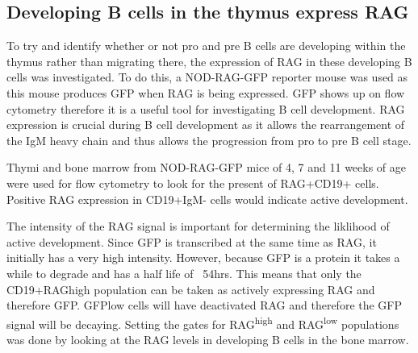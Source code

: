 \subsection{Developing B cells in the thymus express RAG}


To try and identify whether or not pro and pre B cells are developing within the thymus rather than migrating there, the expression of RAG in these developing B cells was investigated.
To do this, a NOD-RAG-GFP reporter mouse was used as this mouse produces GFP when RAG is being expressed.
GFP shows up on flow cytometry therefore it is a useful tool for investigating B cell development.
RAG expression is crucial during B cell development as it allows the rearrangement of the IgM heavy chain and thus allows the progression from pro to pre B cell stage.

Thymi and bone marrow from NOD-RAG-GFP mice of 4, 7 and 11 weeks of age were used for flow cytometry to look for the present of RAG+CD19+ cells.
Positive RAG expression in CD19+IgM- cells would indicate active development.

The intensity of the RAG signal is important for determining the liklihood of active development.
Since GFP is transcribed at the same time as RAG, it initially has a very high intensity.
However, because GFP is a protein it takes a while to degrade and has a half life of ~54hrs.
This means that only the CD19+RAGhigh population can be taken as actively expressing RAG and therefore GFP.
GFPlow cells will have deactivated RAG and therefore the GFP signal will be decaying.
Setting the gates for RAG\textsuperscript{high} and RAG\textsuperscript{low} populations was done by looking at the RAG levels in developing B cells in the bone marrow.


